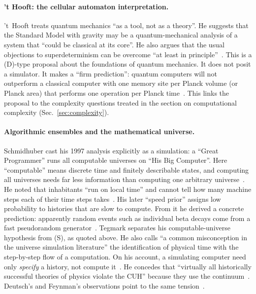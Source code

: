 \paragraph{'t Hooft: the cellular automaton interpretation.} 't~Hooft treats
quantum mechanics ``as a tool, not as a theory''. He suggests that the Standard
Model with gravity may be a quantum-mechanical analysis of a system that
``could be classical at its core''. He also argues that the usual objections to
superdeterminism can be overcome ``at least in principle''~\cite{tHooft2016cellular}.
This is a (D)-type proposal about the foundations of quantum mechanics. It does
not posit a simulator. It makes a ``firm prediction'': quantum computers will
not outperform a classical computer with one memory site per Planck volume (or
Planck area) that performs one operation per Planck time~\cite{tHooft2016cellular}.
This links the proposal to the complexity questions treated in the section on
computational complexity (Sec.~\ref{sec:complexity}).


\paragraph{Algorithmic ensembles and the mathematical universe.} Schmidhuber
cast his 1997 analysis explicitly as a simulation: a ``Great Programmer''
runs all computable universes on ``His Big Computer''. Here ``computable''
means discrete time and finitely describable states, and computing all
universes needs far less information than computing one arbitrary
universe~\cite{Schmidhuber1997computer}. He noted that inhabitants ``run on
local time'' and cannot tell how many machine steps each of their time steps
takes~\cite{Schmidhuber1997computer}. His later ``speed prior'' assigns low
probability to histories that are slow to compute. From it he derived a
concrete prediction: apparently random events such as
individual beta decays come from a fast pseudorandom
generator~\cite{Schmidhuber2000algorithmic}. Tegmark separates his
computable-universe hypothesis from (S), as quoted above. He also calls
``a common misconception in the universe simulation literature'' the
identification of physical time with the step-by-step flow of a computation.
On his account, a simulating computer need only \emph{specify} a history, not
compute it~\cite{Tegmark2008mathematical}. He concedes that ``virtually all
historically successful theories of physics violate the CUH'' because they use
the continuum~\cite{Tegmark2008mathematical}. Deutsch's and Feynman's
observations point to the same tension~\cite{Deutsch1985quantum,Feynman1982simulating}.

